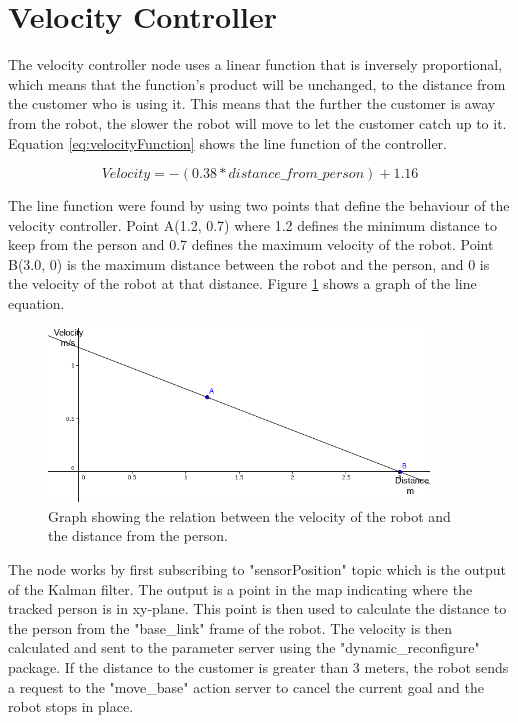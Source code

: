 \section{Velocity Controller}\label{sec:velocity_controller}
The velocity controller node uses a linear function that is inversely proportional, which means that the function's product will be unchanged, to the distance from the customer who is using it. This means that the further the customer is away from the robot, the slower the robot will move to let the customer catch up to it. Equation \ref{eq:velocityFunction} shows the line function of the controller.

\begin{equation}
    Velocity = -(0.38 * distance\_from\_person) + 1.16
    \label{eq:velocityFunction}
\end{equation}

The line function were found by using two points that define the behaviour of the velocity controller. Point A(1.2, 0.7) where 1.2 defines the minimum distance to keep from the person and 0.7 defines the maximum velocity of the robot. Point B(3.0, 0) is the maximum distance between the robot and the person, and 0 is the velocity of the robot at that distance. Figure \ref{fig:velocity_controller_graph} shows a graph of the line equation.

\begin{figure}[H]
    \centering
    \includegraphics[width=0.9\textwidth]{figures/velocity_distance_graph.png}
    \caption{Graph showing the relation between the velocity of the robot and the distance from the person.}
    \label{fig:velocity_controller_graph}
\end{figure}

The node works by first subscribing to "sensorPosition" topic which is the output of the Kalman filter. The output is a point in the map indicating where the tracked person is in xy-plane. This point is then used to calculate the distance to the person from the "base\_link" frame of the robot. The velocity is then calculated and sent to the parameter server using the "dynamic\_reconfigure" package. If the distance to the customer is greater than 3 meters, the robot sends a request to the "move\_base" action server to cancel the current goal and the robot stops in place.